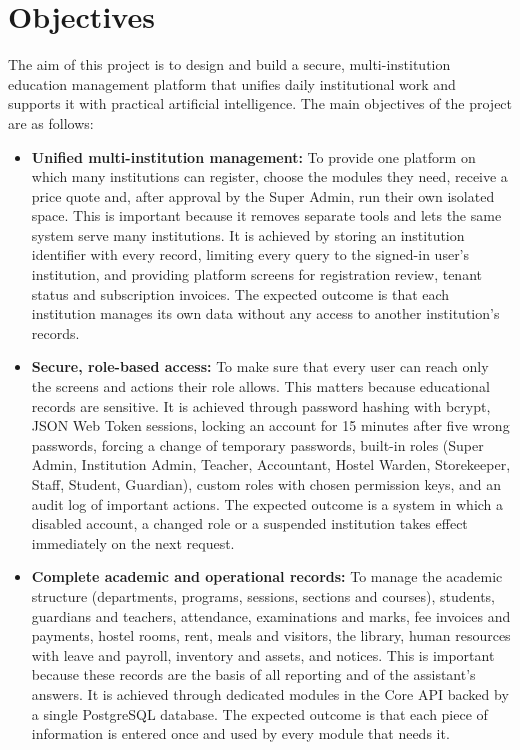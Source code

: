 \section{Objectives}
The aim of this project is to design and build a secure, multi-institution education management platform that unifies daily institutional work and supports it with practical artificial intelligence.
The main objectives of the project are as follows:
\begin{itemize}
    \item \textbf{Unified multi-institution management:} To provide one platform on which many institutions can register, choose the modules they need, receive a price quote and, after approval by the Super Admin, run their own isolated space. This is important because it removes separate tools and lets the same system serve many institutions. It is achieved by storing an institution identifier with every record, limiting every query to the signed-in user's institution, and providing platform screens for registration review, tenant status and subscription invoices. The expected outcome is that each institution manages its own data without any access to another institution's records.

    \item \textbf{Secure, role-based access:} To make sure that every user can reach only the screens and actions their role allows. This matters because educational records are sensitive. It is achieved through password hashing with bcrypt, JSON Web Token sessions, locking an account for 15 minutes after five wrong passwords, forcing a change of temporary passwords, built-in roles (Super Admin, Institution Admin, Teacher, Accountant, Hostel Warden, Storekeeper, Staff, Student, Guardian), custom roles with chosen permission keys, and an audit log of important actions. The expected outcome is a system in which a disabled account, a changed role or a suspended institution takes effect immediately on the next request.

    \item \textbf{Complete academic and operational records:} To manage the academic structure (departments, programs, sessions, sections and courses), students, guardians and teachers, attendance, examinations and marks, fee invoices and payments, hostel rooms, rent, meals and visitors, the library, human resources with leave and payroll, inventory and assets, and notices. This is important because these records are the basis of all reporting and of the assistant's answers. It is achieved through dedicated modules in the Core API backed by a single PostgreSQL database. The expected outcome is that each piece of information is entered once and used by every module that needs it.


\end{itemize}
